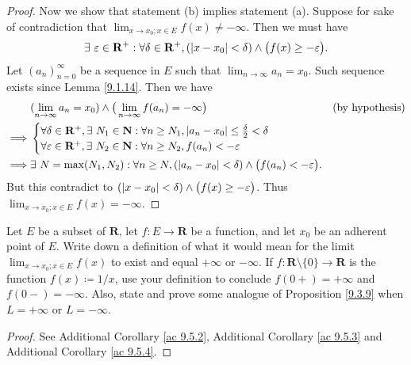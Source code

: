 \begin{proof}
    Now we show that statement (b) implies statement (a).
    Suppose for sake of contradiction that \(\lim_{x \to x_0 ; x \in E} f(x) \neq -\infty\).
    Then we must have
    \[
        \exists\ \varepsilon \in \mathbf{R}^+ : \forall \delta \in \mathbf{R}^+, (\abs*{x - x_0} < \delta) \land \big(f(x) \geq -\varepsilon\big).
    \]
    Let \((a_n)_{n = 0}^\infty\) be a sequence in \(E\) such that \(\lim_{n \to \infty} a_n = x_0\).
    Such sequence exists since Lemma \ref{9.1.14}.
    Then we have
    \begin{align*}
                 & (\lim_{n \to \infty} a_n = x_0) \land \big(\lim_{n \to \infty} f(a_n) = -\infty\big)                                                  & \text{(by hypothesis)} \\
        \implies & \begin{cases}
                       \forall \delta \in \mathbf{R}^+, \exists\ N_1 \in \mathbf{N} : \forall n \geq N_1, \abs*{a_n - x_0} \leq \frac{\delta}{2} < \delta \\
                       \forall \varepsilon \in \mathbf{R}^+, \exists\ N_2 \in \mathbf{N} : \forall n \geq N_2, f(a_n) < -\varepsilon
                   \end{cases}                             \\
        \implies & \exists\ N = \max(N_1, N_2) : \forall n \geq N, (\abs*{a_n - x_0} < \delta) \land \big(f(a_n) < -\varepsilon\big).
    \end{align*}
    But this contradict to \((\abs*{x - x_0} < \delta) \land \big(f(x) \geq -\varepsilon\big)\).
    Thus \(\lim_{x \to x_0 ; x \in E} f(x) = -\infty\).
\end{proof}

\exercisesection

\begin{exercise}\label{ex 9.5.1}
    Let \(E\) be a subset of \(\mathbf{R}\), let \(f : E \to \mathbf{R}\) be a function, and let \(x_0\) be an adherent point of \(E\).
    Write down a definition of what it would mean for the limit \(\lim_{x \to x_0 ; x \in E} f(x)\) to exist and equal \(+\infty\) or \(-\infty\).
    If \(f : \mathbf{R} \setminus \{0\} \to \mathbf{R}\) is the function \(f(x) \coloneqq 1 / x\), use your definition to conclude \(f(0+) = +\infty\) and \(f(0-) = -\infty\).
    Also, state and prove some analogue of Proposition \ref{9.3.9} when \(L = +\infty\) or \(L = -\infty\).
\end{exercise}

\begin{proof}
    See Additional Corollary \ref{ac 9.5.2}, Additional Corollary \ref{ac 9.5.3} and Additional Corollary \ref{ac 9.5.4}.
\end{proof}